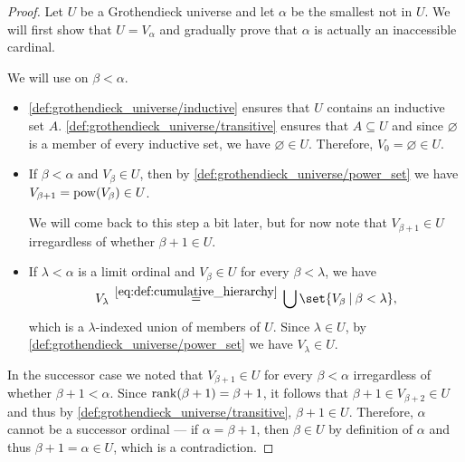\begin{proof}
  \NecessitySubProof Let \( U \) be a Grothendieck universe and let \( \alpha \) be the smallest  not in \( U \). We will first show that \( U = V_\alpha \) and gradually prove that \( \alpha \) is actually an inaccessible cardinal.

   We will use  on \( \beta < \alpha \).
  \begin{itemize}
    \item \ref{def:grothendieck_universe/inductive} ensures that \( U \) contains an inductive set \( A \). \ref{def:grothendieck_universe/transitive} ensures that \( A \subseteq U \) and since \( \varnothing \) is a member of every inductive set, we have \( \varnothing \in U \). Therefore, \( V_0 = \varnothing \in U \).

    \item If \( \beta < \alpha \) and \( V_\beta \in U \), then by \ref{def:grothendieck_universe/power_set} we have \( V_{\beta + 1} = \operatorname{pow}(V_\beta) \in U \).

    We will come back to this step a bit later, but for now note that \( V_{\beta + 1} \in U \) irregardless of whether \( \beta + 1 \in U \).

    \item If \( \lambda < \alpha \) is a limit ordinal and \( V_\beta \in U \) for every \( \beta < \lambda \), we have
    \begin{equation*}
      V_\lambda
      \reloset {\eqref{eq:def:cumulative_hierarchy}} =
      \bigcup\set{ V_\beta \given \beta < \lambda },
    \end{equation*}
    which is a \( \lambda \)-indexed union of members of \( U \). Since \( \lambda \in U \), by \ref{def:grothendieck_universe/power_set} we have \( V_\lambda \in U \).
  \end{itemize}

   In the successor case we noted that \( V_{\beta + 1} \in U \) for every \( \beta < \alpha \) irregardless of whether \( \beta + 1 < \alpha \). Since \( \operatorname{rank}(\beta + 1) = \beta + 1 \), it follows that \( \beta + 1 \in V_{\beta + 2} \in U \) and thus by \ref{def:grothendieck_universe/transitive}, \( \beta + 1 \in U \). Therefore, \( \alpha \) cannot be a successor ordinal --- if \( \alpha = \beta + 1 \), then \( \beta \in U \) by definition of \( \alpha \) and thus \( \beta + 1 = \alpha \in U \), which is a contradiction.


\end{proof}
